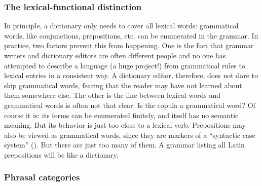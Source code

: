 \documentclass{article}
\begin{document}
\subsubsection{The lexical-functional distinction}

In principle, a dictionary only needs to cover all lexical words:
grammatical words, like conjunctions, prepositions, etc. can be enumerated in the grammar.
In practice, two factors prevent this from happening.
One is the fact that grammar writers and dictionary editors are often different people 
and no one has attempted to describe a language (a huge project!) 
from grammatical rules to lexical entries in a consistent way.
A dictionary editor, therefore, does not dare to skip grammatical words,
fearing that the reader may have not learned about them somewhere else.
The other is the line between lexical words and grammatical words is often not that clear.
Is the copula a grammatical word?
Of course it is: its forms can be enumerated finitely,
and itself has no semantic meaning.
But its behavior is just too close to a lexical verb.
Prepositions may also be viewed as grammatical words,
since they are markers of a ``syntactic case system'' ().
But there are just too many of them.
A grammar listing all Latin prepositions will be like a dictionary.

\subsubsection{Phrasal categories}
\end{document}

